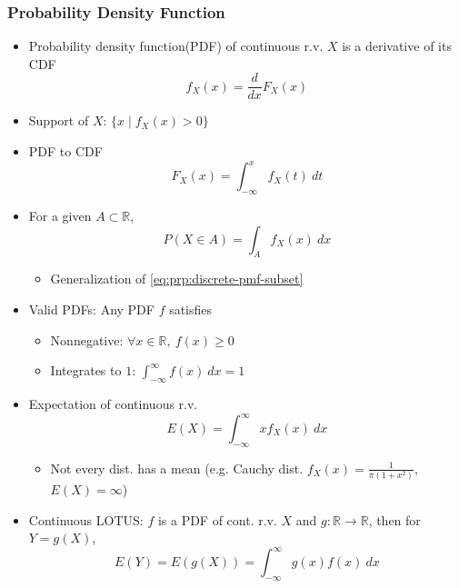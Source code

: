 \subsubsection*{Probability Density Function}
\begin{itemize}
    \item Probability density function(PDF) of continuous r.v. $X$ is a derivative of its CDF
    \begin{equation}
        f_X(x)=\frac{d}{dx}F_X(x)
    \end{equation}
    \item Support of $X$: $\{x\mid f_X(x)>0\}$
    \item PDF to CDF
    \begin{equation}
        F_X(x)=\int_{-\infty}^{x}f_X(t)~dt
    \end{equation}
    \item For a given $A\subset\mathbb{R}$,
    \begin{equation}
        P(X\in A)=\int_Af_X(x)~dx
    \end{equation}
    \begin{itemize}
        \item Generalization of \ref{eq:prp:discrete-pmf-subset}
    \end{itemize}
    \item Valid PDFs: Any PDF $f$ satisfies
    \begin{itemize}
        \item Nonnegative: $\forall x\in\mathbb{R},~f(x)\geq 0$
        \item Integrates to $1$: $\int_{-\infty}^{\infty}f(x)~dx=1$
    \end{itemize}
    \item Expectation of continuous r.v.
    \begin{equation}
        E(X)=\int_{-\infty}^{\infty}xf_X(x)~dx
    \end{equation}
    \begin{itemize}
        \item Not every dist. has a mean (e.g. Cauchy dist. $f_X(x)=\frac{1}{\pi(1+x^2)}$, $E(X)=\infty$)
    \end{itemize}
    \item Continuous LOTUS: $f$ is a PDF of cont. r.v. $X$ and $g:\mathbb{R}\to\mathbb{R}$, then for $Y=g(X)$,
    \begin{equation}
        E(Y)=E(g(X))=\int_{-\infty}^{\infty}g(x)f(x)~dx
    \end{equation}
\end{itemize}

